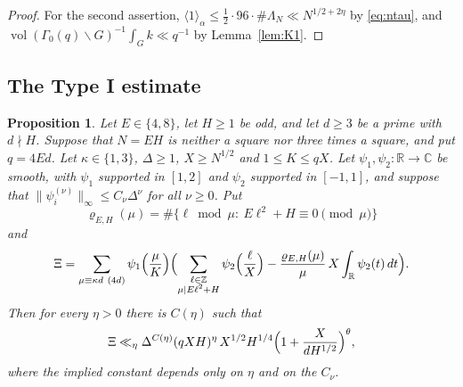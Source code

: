 \documentclass[11pt]{amsart}
\newtheorem{proposition}[theorem]{Proposition}
\theoremstyle{remark}
\theoremstyle{definition}
\numberwithin{equation}{section}
\newcommand{\Z}{\mathbb{Z}}
\newcommand{\R}{\mathbb{R}}
\newcommand{\C}{\mathbb{C}}
\newcommand{\vol}{\operatorname{vol}}
\newcommand{\br}[1]{\langle #1\rangle}
\begin{document}
\begin{proof}
For the second assertion, $\br{1}_\alpha\le\frac12\cdot96\cdot\#\Lambda_N\ll N^{1/2+2\eta}$ by \eqref{eq:ntau}, and $\vol(\Gamma_0(q)\backslash G)^{-1}\int_Gk\ll q^{-1}$ by Lemma~\ref{lem:K1}.
\end{proof}

\subsection{The Type I estimate}

\begin{proposition}\label{prop:typeI}
Let $E\in\{4,8\}$, let $H\ge1$ be odd, and let $d\ge3$ be a prime with $d\nmid H$. Suppose that $N=EH$ is neither a square nor three times a square, and put $q=4Ed$. Let $\kappa\in\{1,3\}$, $\Delta\ge1$, $X\ge N^{1/2}$ and $1\le K\le qX$. Let $\psi_1,\psi_2:\R\to\C$ be smooth, with $\psi_1$ supported in $[1,2]$ and $\psi_2$ supported in $[-1,1]$, and suppose that $\|\psi_i^{(\nu)}\|_\infty\le C_\nu\Delta^\nu$ for all $\nu\ge0$. Put
\[
\varrho_{E,H}(\mu)=\#\{\ell\bmod\mu:\ E\ell^2+H\equiv0\pmod\mu\}
\]
and
\[
\Xi=\sum_{\mu\equiv\kappa d\ (4d)}\psi_1\Bigl(\frac\mu K\Bigr)\Bigl(\sum_{\substack{\ell\in\Z\\ \mu\mid E\ell^2+H}}\psi_2\Bigl(\frac\ell X\Bigr)-\frac{\varrho_{E,H}(\mu)}{\mu}\,X\int_\R\psi_2(t)\,dt\Bigr).
\]
Then for every $\eta>0$ there is $C(\eta)$ such that
\[
\Xi\ll_\eta\Delta^{C(\eta)}(qXH)^{\eta}\,X^{1/2}H^{1/4}\Bigl(1+\frac{X}{dH^{1/2}}\Bigr)^{\theta},
\]
where the implied constant depends only on $\eta$ and on the $C_\nu$.
\end{proposition}
\end{document}
